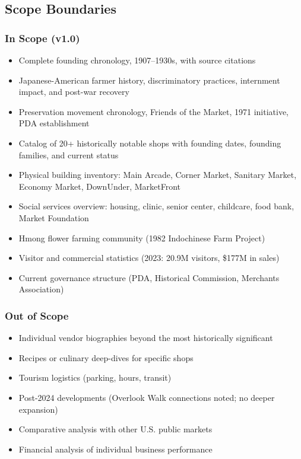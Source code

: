 \documentclass[11pt,letterpaper]{article}
\begin{document}
\subsection{Scope Boundaries}

\subsubsection{In Scope (v1.0)}
\begin{itemize}[noitemsep]
  \item Complete founding chronology, 1907--1930s, with source citations
  \item Japanese-American farmer history, discriminatory practices, internment impact, and post-war recovery
  \item Preservation movement chronology, Friends of the Market, 1971 initiative, PDA establishment
  \item Catalog of 20+ historically notable shops with founding dates, founding families, and current status
  \item Physical building inventory: Main Arcade, Corner Market, Sanitary Market, Economy Market, DownUnder, MarketFront
  \item Social services overview: housing, clinic, senior center, childcare, food bank, Market Foundation
  \item Hmong flower farming community (1982 Indochinese Farm Project)
  \item Visitor and commercial statistics (2023: 20.9M visitors, \$177M in sales)
  \item Current governance structure (PDA, Historical Commission, Merchants Association)
\end{itemize}

\subsubsection{Out of Scope}
\begin{itemize}[noitemsep]
  \item Individual vendor biographies beyond the most historically significant
  \item Recipes or culinary deep-dives for specific shops
  \item Tourism logistics (parking, hours, transit)
  \item Post-2024 developments (Overlook Walk connections noted; no deeper expansion)
  \item Comparative analysis with other U.S. public markets
  \item Financial analysis of individual business performance
\end{itemize}
\end{document}
